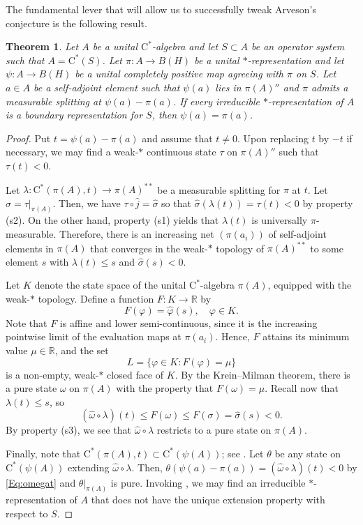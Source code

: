 \documentclass[10pt]{amsart}
\newcommand{\bR}{{\mathbb{R}}}
\newcommand{\rC}{\mathrm{C}}
\renewcommand{\phi}{\varphi}
\newtheorem{theorem}[lemma]{Theorem}
\theoremstyle{definition}
\begin{document}
The fundamental lever that will allow us to successfully tweak Arveson's conjecture is the following result.

\begin{theorem}\label{T:meastrick}
Let $A$ be a unital $\rC^*$-algebra and let $S\subset A$ be an operator system such that $A=\rC^*(S)$. Let $\pi:A\to B(H)$ be a unital $*$-representation  and let $\psi:A\to B(H)$ be a unital completely positive map agreeing with $\pi$ on $S$. Let $a\in A$ be a self-adjoint element such that $\psi(a)$ lies in $\pi(A)''$ and $\pi$ admits a measurable splitting  at $\psi(a)-\pi(a)$. If  every irreducible $*$-representation of $A$ is a boundary representation for $S$, then  $\psi(a)=\pi(a)$.
\end{theorem}
\begin{proof}

Put $t=\psi(a)-\pi(a)$ and assume that $t\neq 0$. Upon replacing $t$ by $-t$ if necessary, we may find a weak-$*$ continuous state $\tau$ on $\pi(A)''$ such that $\tau(t)<0$. 

Let $\lambda:\rC^*(\pi(A),t)\to \pi(A)^{**}$ be a measurable splitting for $\pi$ at $t$.
Let $\sigma=\tau|_{\pi(A)}$. Then, we have $\tau\circ \widehat j=\widehat\sigma$ so that $\widehat\sigma(\lambda(t))=\tau(t)<0$ by property (s2). On the other hand, property (s1) yields that $\lambda(t)$ is universally $\pi$-measurable.  Therefore, there is  an increasing net $(\pi(a_i))$ of self-adjoint elements in $\pi(A)$ that converges in the weak-$*$ topology of $\pi(A)^{**}$  to some element $s$ with $\lambda(t)\leq s$ and $\widehat\sigma(s)<0$. 


Let $K$ denote the state space of the unital $\rC^*$-algebra $\pi(A)$, equipped with the weak-$*$ topology. Define a function $F:K\to \bR$ by
\[
F(\phi)=\widehat\phi(s),\quad \phi\in K.
\]
Note that $F$ is affine and lower semi-continuous, since it is the increasing pointwise limit of the evaluation maps at $\pi(a_i)$. Hence, $F$ attains its minimum value $\mu\in \bR$, and the set
\[L=\{\phi\in K:F(\phi)=\mu\}\] is a non-empty, weak-$*$ closed face of $K$.
By the Krein--Milman theorem, there is a pure state $\omega$ on $\pi(A)$ with the property that $F(\omega)=\mu$. 
Recall now that $\lambda(t)\leq s$, so
\begin{equation}\label{Eq:omegat}
(\widehat\omega \circ \lambda)(t)\leq F(\omega)\leq  F(\sigma)=\widehat\sigma(s)<0.
\end{equation}
By property (s3), we see that $\widehat\omega \circ \lambda$ restricts to a pure state on $\pi(A)$. 

Finally, note that $\rC^*(\pi(A),t)\subset \rC^*(\psi(A))$; see \cite[Equation (3.1)]{clouatre2018unperforated}. Let $\theta$ be any state on $\rC^*(\psi(A))$ extending $\widehat\omega\circ \lambda$. Then, $\theta(\psi(a)-\pi(a))=(\widehat\omega \circ \lambda)(t)<0$ by \eqref{Eq:omegat} and $\theta|_{\pi(A)}$ is pure.
Invoking \cite[Lemma 3.1]{clouatre2018unperforated}, we may find an irreducible $*$-representation of $A$ that does not have the unique extension property with respect to $S$.
\end{proof}
\end{document}
